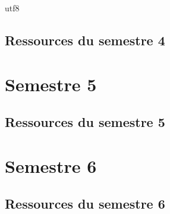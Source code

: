 utf8\documentclass[10pt,french]{article} %
\begin{document}
\subsection{Ressources du semestre 4}



\section{Semestre 5}
\def\sem{E} %
%
%
%
\subsection{Ressources du semestre 5}



\section{Semestre 6}
\def\sem{F} %
%
%
%
\subsection{Ressources du semestre 6}



%
%
\end{document}
